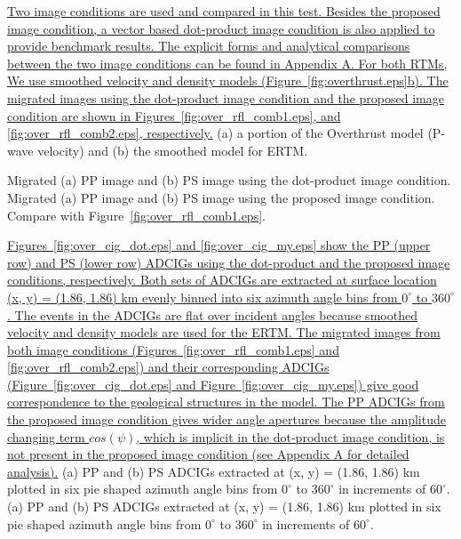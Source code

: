 \documentclass[manuscript,ulem,graphix,revised]{geophysics}
\begin{document}
\uline{Two image \marginpar{[1,4,6,13]} conditions are used and compared in this test. Besides the proposed image condition, a vector based dot-product image condition \mbox{\citep{du17}} is also applied to provide benchmark results. The explicit forms and analytical comparisons between the two image conditions can be found in Appendix A. 
For both RTMs, We use smoothed velocity and density models (Figure~\ref{fig:overthrust.eps}b).  The migrated images using the dot-product image condition and the proposed image condition are shown in Figures~\ref{fig:over_rfl_comb1.eps}, and \ref{fig:over_rfl_comb2.eps}, respectively.}
{
(a) a portion of the Overthrust model (P-wave velocity) and (b) the smoothed model for ERTM.
}

{
Migrated (a) PP image and (b) PS image using the dot-product image condition.
}
{
Migrated (a) PP image and (b) PS image using the proposed image condition. Compare with Figure~\ref{fig:over_rfl_comb1.eps}.
}

\uline{Figures~\ref{fig:over_cig_dot.eps} and \marginpar{[4,6,13]} \ref{fig:over_cig_my.eps} show the PP (upper row) and PS (lower row) ADCIGs using the dot-product and the proposed image conditions, respectively.
 Both sets of ADCIGs are extracted at surface location (x, y) = (1.86, 1.86) km evenly binned into six azimuth angle bins from $\mathrm{0^\circ}$ to $\mathrm{360^\circ}$. The events in the ADCIGs are flat over incident angles because smoothed velocity and density models are used for the ERTM. 
The migrated images from both image conditions (Figures~\ref{fig:over_rfl_comb1.eps} and \ref{fig:over_rfl_comb2.eps}) and their corresponding ADCIGs (Figure~\ref{fig:over_cig_dot.eps} and Figure~\ref{fig:over_cig_my.eps}) give good correspondence to the geological structures in the model. The PP ADCIGs from the proposed image condition gives wider angle apertures because the amplitude changing term $cos(\psi)$, which is implicit in the dot-product image condition, is not present in the proposed image condition (see Appendix A for detailed analysis).}
{
(a) PP and (b) PS ADCIGs extracted at (x, y) = (1.86, 1.86) km plotted in six pie shaped azimuth angle bins from $\mathrm{0^\circ}$ to $\mathrm{360^\circ}$ in increments of $\mathrm{60^\circ}$.
}
{
(a) PP and (b) PS ADCIGs extracted at (x, y) = (1.86, 1.86) km plotted in six pie shaped azimuth angle bins from $\mathrm{0^\circ}$ to $\mathrm{360^\circ}$ in increments of $\mathrm{60^\circ}$.
}
\end{document}
